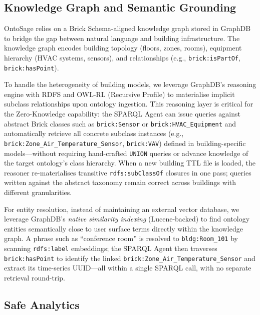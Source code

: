 \documentclass[acmsmall]{acmart}
\begin{document}
\subsection{Knowledge Graph and Semantic Grounding}

OntoSage relies on a Brick Schema-aligned knowledge graph stored in GraphDB to bridge the gap between natural language and building infrastructure. The knowledge graph encodes building topology (floors, zones, rooms), equipment hierarchy (HVAC systems, sensors), and relationships (e.g., \texttt{brick:isPartOf}, \texttt{brick:hasPoint}).

To handle the heterogeneity of building models, we leverage GraphDB's reasoning engine with RDFS and OWL-RL (Recursive Profile) to materialise implicit subclass relationships upon ontology ingestion. This reasoning layer is critical for the Zero-Knowledge capability: the SPARQL Agent can issue queries against abstract Brick classes such as \texttt{brick:Sensor} or \texttt{brick:HVAC\_Equipment} and automatically retrieve all concrete subclass instances (e.g., \texttt{brick:Zone\_Air\_Temperature\_Sensor}, \texttt{brick:VAV}) defined in building-specific models---without requiring hand-crafted \texttt{UNION} queries or advance knowledge of the target ontology's class hierarchy. When a new building TTL file is loaded, the reasoner re-materialises transitive \texttt{rdfs:subClassOf} closures in one pass; queries written against the abstract taxonomy remain correct across buildings with different granularities.

For entity resolution, instead of maintaining an external vector database, we leverage GraphDB's \emph{native similarity indexing} (Lucene-backed) to find ontology entities semantically close to user surface terms directly within the knowledge graph. A phrase such as ``conference room'' is resolved to \texttt{bldg:Room\_101} by scanning \texttt{rdfs:label} embeddings; the SPARQL Agent then traverses \texttt{brick:hasPoint} to identify the linked \texttt{brick:Zone\_Air\_Temperature\_Sensor} and extract its time-series UUID---all within a single SPARQL call, with no separate retrieval round-trip.

\subsection{Safe Analytics}
\end{document}
